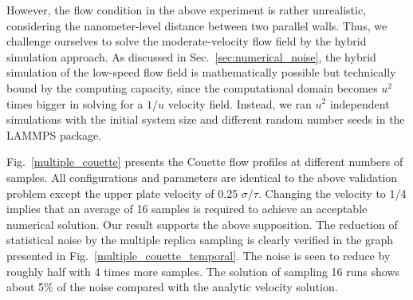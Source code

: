 \documentclass[preprint,12pt]{elsarticle}
\begin{document}
However, the flow condition in the above experiment is rather unrealistic, considering the nanometer-level distance between two parallel walls. Thus, we challenge ourselves to solve the moderate-velocity flow field by the hybrid simulation approach. As discussed in Sec.~\ref{sec:numerical_noise}, the hybrid simulation of the low-speed flow field is mathematically possible but technically bound by the computing capacity, since the computational domain becomes $u^2$ times bigger in solving for a $1/u$ velocity field. Instead, we ran $u^2$ independent simulations with the initial system size and different random number seeds in the LAMMPS package.

Fig.~\ref{multiple_couette} presents the Couette flow profiles at different numbers of samples. All configurations and parameters are identical to the above validation problem except the upper plate velocity of 0.25 $\sigma/\tau$.  Changing the velocity to 1/4 implies that an average of 16 samples is required to achieve an acceptable numerical solution. Our result supports the above supposition. The reduction of statistical noise by the multiple replica sampling is clearly verified in the graph presented in Fig.~\ref{multiple_couette_temporal}. The noise is seen to reduce by roughly half with 4 times more samples. The solution of sampling 16 runs shows about 5$\%$ of the noise compared with the analytic velocity solution.
\end{document}
